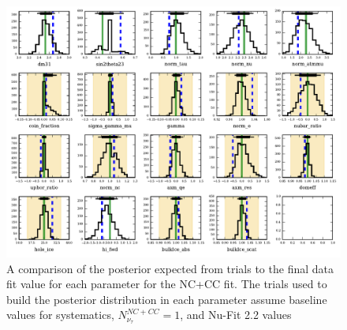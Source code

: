 \begin{figure}{}
	\centering \includegraphics[width=\textwidth]{nc+cc_systematics.pdf}
	\caption[The NC+CC posterior distributions expected compared to final fit values]{A comparison of the posterior expected from trials to the final data fit value for each parameter for the NC+CC fit. The trials used to build the posterior distribution in each parameter assume baseline values for systematics, $N_{\nu_\tau}^{NC+CC}=1$, and Nu-Fit 2.2 values \cite{NuFit_2.2}}
	\label{fig:posteriors_nc_cc}
\end{figure}


